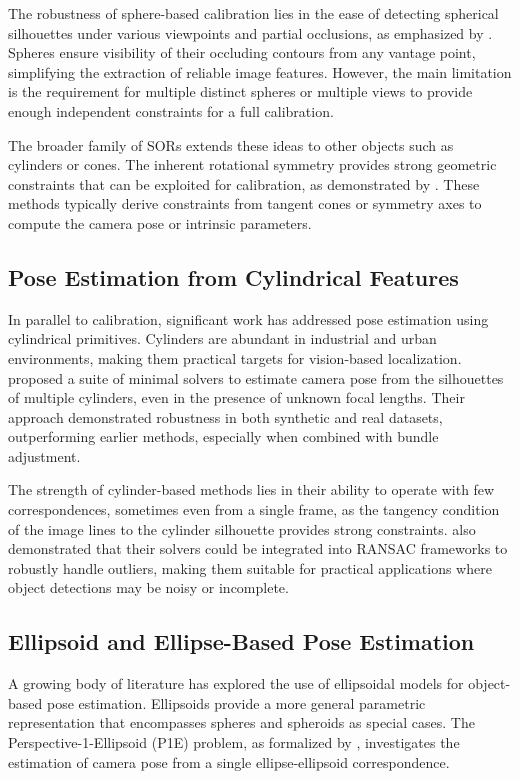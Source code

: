 The robustness of sphere-based calibration lies in the ease of detecting spherical silhouettes under various viewpoints and partial occlusions, as emphasized by \cite{Zhang2007}. Spheres ensure visibility of their occluding contours from any vantage point, simplifying the extraction of reliable image features. However, the main limitation is the requirement for multiple distinct spheres or multiple views to provide enough independent constraints for a full calibration.

The broader family of SORs extends these ideas to other objects such as cylinders or cones. The inherent rotational symmetry provides strong geometric constraints that can be exploited for calibration, as demonstrated by \cite{Li2024}. These methods typically derive constraints from tangent cones or symmetry axes to compute the camera pose or intrinsic parameters.

\subsection{Pose Estimation from Cylindrical Features}

In parallel to calibration, significant work has addressed pose estimation using cylindrical primitives. Cylinders are abundant in industrial and urban environments, making them practical targets for vision-based localization. \cite{gummeson22pose} proposed a suite of minimal solvers to estimate camera pose from the silhouettes of multiple cylinders, even in the presence of unknown focal lengths. Their approach demonstrated robustness in both synthetic and real datasets, outperforming earlier methods, especially when combined with bundle adjustment.

The strength of cylinder-based methods lies in their ability to operate with few correspondences, sometimes even from a single frame, as the tangency condition of the image lines to the cylinder silhouette provides strong constraints. \cite{gummeson22pose} also demonstrated that their solvers could be integrated into RANSAC frameworks to robustly handle outliers, making them suitable for practical applications where object detections may be noisy or incomplete.

\subsection{Ellipsoid and Ellipse-Based Pose Estimation}

A growing body of literature has explored the use of ellipsoidal models for object-based pose estimation. Ellipsoids provide a more general parametric representation that encompasses spheres and spheroids as special cases. The Perspective-1-Ellipsoid (P1E) problem, as formalized by \cite{Gaudilliere2023}, investigates the estimation of camera pose from a single ellipse-ellipsoid correspondence.

